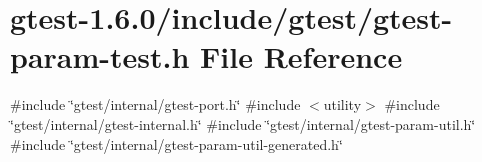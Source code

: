 \hypertarget{gtest-param-test_8h}{\section{gtest-\/1.6.0/include/gtest/gtest-\/param-\/test.h \-File \-Reference}
\label{d0/d31/gtest-param-test_8h}
}
{\ttfamily \#include \char`\"{}gtest/internal/gtest-\/port.\-h\char`\"{}}\*
{\ttfamily \#include $<$utility$>$}\*
{\ttfamily \#include \char`\"{}gtest/internal/gtest-\/internal.\-h\char`\"{}}\*
{\ttfamily \#include \char`\"{}gtest/internal/gtest-\/param-\/util.\-h\char`\"{}}\*
{\ttfamily \#include \char`\"{}gtest/internal/gtest-\/param-\/util-\/generated.\-h\char`\"{}}\*
